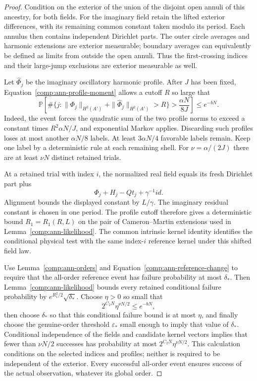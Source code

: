 \begin{proof}
Condition on the exterior of the union of the disjoint open annuli of
this ancestry, for both fields.  For the imaginary field retain the
lifted exterior differences, with its remaining common constant taken
modulo its period.  Each annulus then contains independent Dirichlet
parts.  The outer circle averages and harmonic extensions are exterior
measurable; boundary averages can equivalently be defined as limits from
outside the open annuli.  Thus the first-crossing indices and their
large-jump exclusions are exterior measurable as well.

Let $\widehat\Phi_j$ be the imaginary oscillatory harmonic profile.
After $J$ has been fixed, Equation~\eqref{comp:ann-profile-moment}
allows a cutoff $R$ so large that
\[
 \mathbb P\!\left[
 \#\{j:\|\Phi_j\|_{H^2(A')}+
             \|\widehat\Phi_j\|_{H^2(A')}>R\}
        >\frac{\alpha N}{8J}\right]\leq e^{-bN}.
\]
Indeed, the event forces the quadratic sum of the two profile norms to
exceed a constant times $R^2\alpha N/J$, and exponential Markov applies.
Discarding such profiles loses at most another $\alpha N/8$ labels.
At least $3\alpha N/4$ favorable labels remain.  Keep one label by a
deterministic rule at each remaining shell.  For
$\nu=\alpha/(2J)$ there are at least $\nu N$ distinct retained trials.

At a retained trial with index $i$, the normalized real field equals
its fresh Dirichlet part plus
\[
 \Phi_j+H_j-Qt_j+\gamma^{-1}id.
\]
Alignment bounds the displayed constant by $L/\gamma$.  The imaginary
residual constant is chosen in one period.  The profile cutoff therefore
gives a deterministic bound $R_1=R_1(R,L)$ on the pair of
Cameron--Martin extensions used in
Lemma~\ref{comp:ann-likelihood}.  The common intrinsic kernel identity
identifies the conditional physical test with the same index-$i$
reference kernel under this shifted field law.

Use Lemma~\ref{comp:ann-orders} and
Equation~\eqref{comp:ann-reference-change} to require that the all-order
reference event has failure probability at most $\delta_*$.  Then
Lemma~\ref{comp:ann-likelihood} bounds every retained conditional
failure probability by $e^{R_1^2/2}\sqrt{\delta_*}$.
Choose $\eta>0$ so small that
\[
 2^{C_2N}\eta^{\nu N/2}\leq e^{-bN},
\]
then choose $\delta_*$ so that this conditional failure bound is at most
$\eta$, and finally choose the genuine-order threshold
$\varepsilon_*$ small enough to imply that value of $\delta_*$.
Conditional independence of the fields and candidate kernel vectors
implies that fewer than $\nu N/2$ successes has probability at most
$2^{C_2N}\eta^{\nu N/2}$.  This calculation conditions on the selected
indices and profiles; neither is required to be independent of the
exterior.  Every successful all-order event ensures success of the
actual observation, whatever its global order.


\end{proof}
